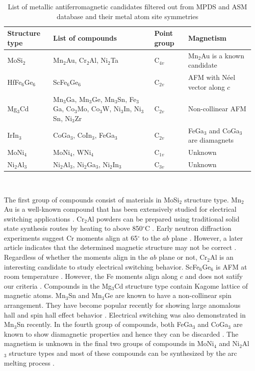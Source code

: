 \documentclass[10pt,doublespacing,edeposit]{uiucthesis2020}
\begin{document}
\begin{mainmatter}
\renewcommand{\arraystretch}{1.2}
\begin{table}
\caption{\label{tab:metallic_afm_candidates} 
List of metallic antiferromagnetic candidates filtered out from MPDS and ASM database and their metal atom site symmetries}
\centering
\begin{tabular}{>{\raggedright\arraybackslash}p{3cm}>{\raggedright\arraybackslash}p{4cm}>{\centering}p{3cm}>{\raggedright\arraybackslash}p{4cm}}
\hline\hline
\textbf{Structure type} & \textbf{List of compounds} & \textbf{Point group} & \textbf{Magnetism}\\
\hline
MoSi$_2$ & Mn$_2$Au, Cr$_2$Al, Ni$_2$Ta & C$_{4v}$ & Mn$_2$Au is a known candidate\\
\hline
HfFe$_6$Ge$_6$ & ScFe$_6$Ge$_6$ & C$_{2v}$ & AFM with N\'eel vector along $c$\\
\hline
Mg$_3$Cd & Mn$_3$Ga, Mn$_3$Ge, Mn$_3$Sn, Fe$_3$Ga, Co$_3$Mo, Co$_3$W, Ni$_3$In, Ni$_3$Sn, Ni$_3$Zr & C$_{2v}$ & Non-collinear AFM\\
\hline
IrIn$_3$ & CoGa$_3$, CoIn$_3$, FeGa$_3$ & C$_{2v}$ & FeGa$_3$ and CoGa$_3$ are diamagnets\\
\hline
MoNi$_4$ & MoNi$_4$, WNi$_4$ & C$_{1v}$ & Unknown\\
\hline
Ni$_2$Al$_3$ & Ni$_2$Al$_3$, Ni$_2$Ga$_3$, Ni$_2$In$_3$ & C$_{3v}$ & Unknown\\
\hline\hline
\end{tabular}
~\\
\end{table}


The first group of compounds consist of materials in MoSi$_2$ structure type. Mn$_2$Au is a well-known compound that has been extensively studied for electrical switching applications \cite{Meinert2018,Bodnar2019}. Cr$_2$Al powders can be prepared using traditional solid state synthesis routes by heating to above 850$^\circ$C \cite{Susner2015}. Early neutron diffraction experiments suggest Cr moments align at 65$^\circ$ to the $ab$ plane \cite{Atoji1965}. However, a later article indicates that the determined magnetic structure may not be correct \cite{Kallel1967}. Regardless of whether the moments align in the $ab$ plane or not, Cr$_2$Al is an interesting candidate to study electrical switching behavior. ScFe$_6$Ge$_6$ is AFM at room temperature \cite{Venturini1992}. However, the Fe moments align along $c$ and does not satify our criteria \cite{Mazet2000}. Compounds in the Mg$_3$Cd structure type contain Kagome lattice of magnetic atoms. Mn$_3$Sn and Mn$_3$Ge are known to have a non-collinear spin arrangement. They have become popular recently for showing large anomalous hall and spin hall effect behavior \cite{Nakatsuji2015,Kubler2014,Kimata2019}. Electrical switching was also demonstrated in Mn$_3$Sn recently. In the fourth group of compounds, both FeGa$_3$ and CoGa$_3$ are known to show diamagnetic properties and hence they can be discarded \cite{Haussermann2002,Viklund2002,Zhang2017}. The magnetism is unknown in the final two groups of compounds in MoNi$_4$ and Ni$_2$Al$_3$ structure types and most of these compounds can be synthesized by the arc melting process \cite{Harker1944,Taylor1972}.


\end{mainmatter}
\end{document}
